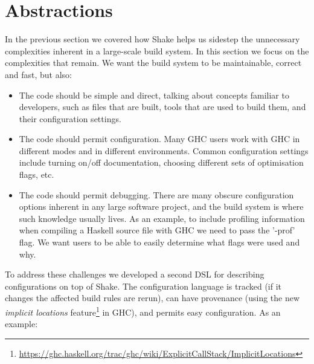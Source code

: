 \section{Abstractions\label{sec:abstractions}}


In the previous section we covered how Shake helps us sidestep the unnecessary
complexities inherent in a large-scale build system. In this section we focus on
the complexities that remain. We want the build system to be maintainable, correct
and fast, but also:

\begin{itemize}
\item The code should be simple and direct, talking about concepts familiar to
developers, such as files that are built, tools that are used to build
them, and their configuration settings.
\item The code should permit configuration. Many GHC users work with GHC in
different modes and in different environments. Common configuration settings
include turning on/off documentation, choosing different sets of optimisation flags,
etc.
\item The code should permit debugging. There are many obscure configuration
options inherent in any large software project, and the build system is where
such knowledge usually lives. As an example, to include profiling information
when compiling a Haskell source file with GHC we need to pass the \lst'-prof' flag.
We want users to be able to easily determine what flags were used and why.
\end{itemize}
\noindent
To address these challenges we developed a
second DSL for describing configurations on top of Shake.
The configuration language is tracked (if it changes the affected build rules
are rerun), can have provenance (using the new \emph{implicit locations}
feature\footnote{\scriptsize{}\url{https://ghc.haskell.org/trac/ghc/wiki/ExplicitCallStack/ImplicitLocations}$\!\!\!$}
in GHC), and permits easy configuration. As an example:

